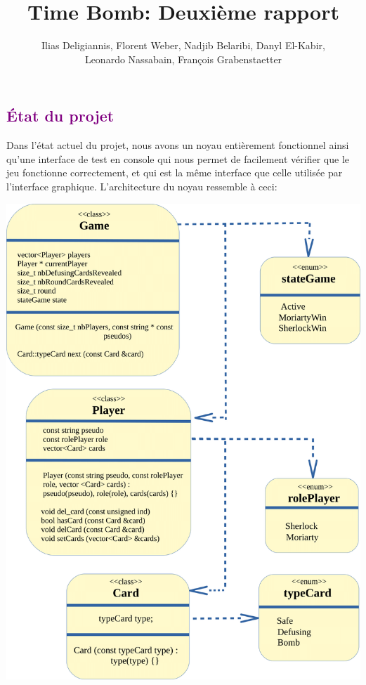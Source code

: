 \documentclass[a4paper]{article}
\title{Time Bomb: Deuxième rapport}
\author{Ilias Deligiannis, Florent Weber, Nadjib Belaribi, Danyl El-Kabir,\\
Leonardo Nassabain, François Grabenstaetter}
\let\oldsection\section
\renewcommand{\section}[1]{\textcolor{purple}{\oldsection{#1}}}
\begin{document}
\sffamily
\everymath{\displaystyle}
\setlength\parindent{0mm}
\setlength{\parskip}{0.2cm}
\maketitle

\section{État du projet}

Dans l'état actuel du projet, nous avons un noyau entièrement fonctionnel ainsi qu'une interface de test en console qui nous permet de facilement vérifier que le jeu fonctionne correctement, et qui est la même interface que celle utilisée par l'interface graphique. L'architecture du noyau ressemble à ceci:

\begin{center}
    \includegraphics[scale=0.75]{img/diagramme.png}
\end{center}
\end{document}
